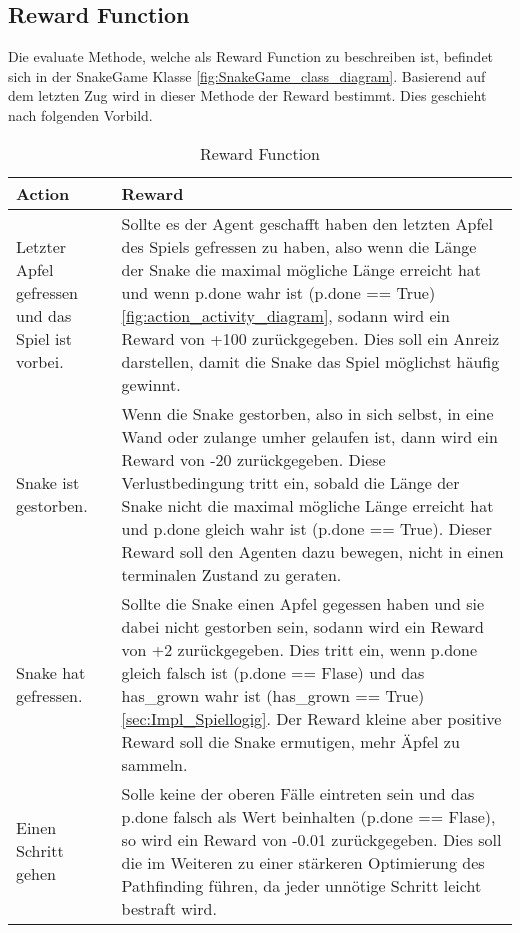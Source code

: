 \subsection{Reward Function}
Die evaluate Methode, welche als Reward Function zu beschreiben ist, befindet sich in der SnakeGame Klasse \ref{fig:SnakeGame_class_diagram}. Basierend auf dem letzten Zug wird in dieser Methode der Reward bestimmt. Dies geschieht nach folgenden Vorbild.
\begin{longtable}[h]{|p{4cm}|p{\linewidth - 5cm}|}
	\caption{Reward Function}
	\label{tab:Reward_Function} 
	\endfirsthead
	\endhead
	\hline
	Action & Reward \\
	\hline
	Letzter Apfel gefressen und das Spiel ist vorbei. & Sollte es der Agent geschafft haben den letzten Apfel des Spiels gefressen zu haben, also wenn die Länge der Snake die maximal mögliche Länge erreicht hat und wenn p.done wahr ist (p.done == True) \ref{fig:action_activity_diagram}, sodann wird ein Reward von +100 zurückgegeben. Dies soll ein Anreiz darstellen, damit die Snake das Spiel möglichst häufig gewinnt.\\
	\hline
	Snake ist gestorben. & Wenn die Snake gestorben, also in sich selbst, in eine Wand oder zulange umher gelaufen ist, dann wird ein Reward von -20 zurückgegeben. Diese Verlustbedingung tritt ein, sobald die Länge der Snake nicht die maximal mögliche Länge erreicht hat und p.done gleich wahr ist (p.done == True). Dieser Reward soll den Agenten dazu bewegen, nicht in einen terminalen Zustand zu geraten. \\
	\hline
	Snake hat gefressen. & Sollte die Snake einen Apfel gegessen haben und sie dabei nicht gestorben sein, sodann wird ein Reward von +2 zurückgegeben. Dies tritt ein, wenn p.done gleich falsch ist (p.done == Flase) und das has\_grown wahr ist (has\_grown == True) \ref{sec:Impl_Spiellogig}. Der Reward kleine aber positive Reward soll die Snake ermutigen, mehr Äpfel zu sammeln. \\
	\hline
	Einen Schritt gehen & Solle keine der oberen Fälle eintreten sein und das p.done falsch als Wert beinhalten (p.done == Flase), so wird ein Reward von -0.01 zurückgegeben. Dies soll die im Weiteren zu einer stärkeren Optimierung des Pathfinding führen, da jeder unnötige Schritt leicht bestraft wird. \\
	\hline
\end{longtable}

